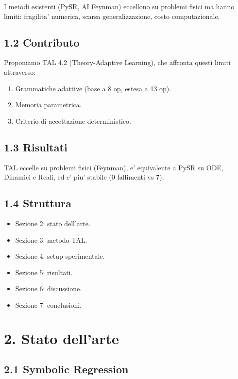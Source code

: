 \documentclass[
]{article}
\providecommand{\tightlist}{%
  \setlength{\itemsep}{0pt}\setlength{\parskip}{0pt}}
\begin{document}
I metodi esistenti (PySR, AI Feynman) eccellono su problemi fisici ma
hanno limiti: fragilita' numerica, scarsa generalizzazione, costo
computazionale.

\subsection{1.2 Contributo}\label{contributo}

Proponiamo TAL 4.2 (Theory-Adaptive Learning), che affronta questi
limiti attraverso:

\begin{enumerate}
\def\labelenumi{\arabic{enumi}.}
\tightlist
\item
  Grammatiche adattive (base a 8 op, estesa a 13 op).
\item
  Memoria parametrica.
\item
  Criterio di accettazione deterministico.
\end{enumerate}

\subsection{1.3 Risultati}\label{risultati}

TAL eccelle su problemi fisici (Feynman), e' equivalente a PySR su ODE,
Dinamici e Reali, ed e' piu' stabile (0 fallimenti vs 7).

\subsection{1.4 Struttura}\label{struttura-1}

\begin{itemize}
\tightlist
\item
  Sezione 2: stato dell'arte.
\item
  Sezione 3: metodo TAL.
\item
  Sezione 4: setup sperimentale.
\item
  Sezione 5: risultati.
\item
  Sezione 6: discussione.
\item
  Sezione 7: conclusioni.
\end{itemize}

\section{2. Stato dell'arte}\label{stato-dellarte}

\subsection{2.1 Symbolic Regression}\label{symbolic-regression}
\end{document}
